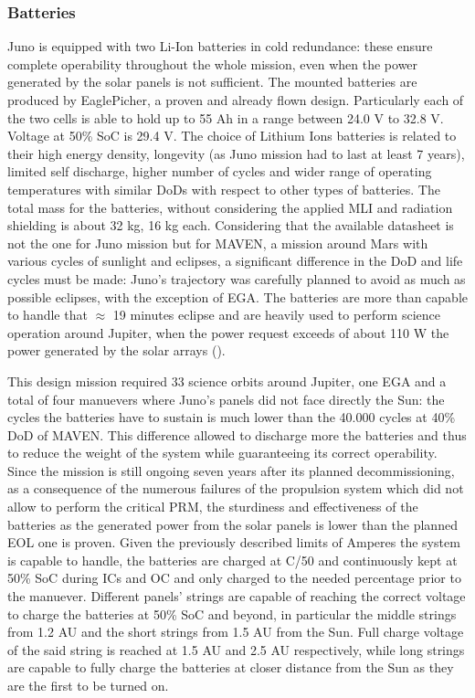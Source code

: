 \subsubsection{Batteries}
\label{subsubsec:Batteries}
Juno is equipped with two Li-Ion batteries in cold redundance: these ensure complete operability throughout the whole mission, even when the power generated by the solar panels is not sufficient.
\mref  
The mounted batteries are produced by EaglePicher, a proven and already flown design\cite{batteries_juno}. Particularly each of the two cells is able to hold up to 55 Ah in a range between 24.0 V to 32.8 V. Voltage at 50\% SoC is 29.4 V\cite{solar_panels_coef}. The choice of Lithium Ions batteries is related to their high energy density, longevity (as Juno mission had to last at least 7 years), limited self discharge, higher number of cycles and wider range of operating temperatures with similar DoDs with respect to other types of batteries.
The total mass for the batteries, without considering the applied MLI and radiation shielding is about 32 kg, 16 kg each. Considering that the available datasheet\cite{batteries_juno} is not the one for Juno mission but for MAVEN, a mission around Mars with various cycles of sunlight and eclipses, a significant difference in the DoD and life cycles must be made: Juno's trajectory was carefully planned to avoid as much as possible eclipses, with the exception of EGA. The batteries are more than capable to handle that $\approx$ 19 minutes eclipse\cite{juno_inner} and are heavily used to perform science operation around Jupiter, when the power request exceeds of about 110 W the power generated by the solar arrays
(\mref).



This design mission required 33 science orbits around Jupiter, one EGA and a total of four manuevers where Juno's panels did not face directly the Sun: the cycles the batteries have to sustain is much lower than the 40.000 cycles at 40\% DoD of MAVEN. This difference allowed to discharge more the batteries and thus to reduce the weight of the system while guaranteeing its correct operability. Since the mission is still ongoing seven years after its planned decommissioning, as a consequence of the numerous failures of the propulsion system which did not allow to perform the critical PRM, the sturdiness and effectiveness of the batteries as the generated power from the solar panels is lower than the planned EOL one is proven. Given the previously described limits of Amperes the system is capable to handle, the batteries are charged at C/50 and continuously kept at 50\% SoC during ICs and OC and only charged to the needed percentage prior to the manuever. Different panels' strings are capable of reaching the correct voltage to charge the batteries at 50\% SoC and beyond, in particular the middle strings from 1.2 AU and the short strings from 1.5 AU from the Sun. Full charge voltage of the said string is reached at 1.5 AU and 2.5 AU respectively, while long strings are capable to fully charge the batteries at closer distance from the Sun as they are the first to be turned on\cite{solar_panels_coef}. 

